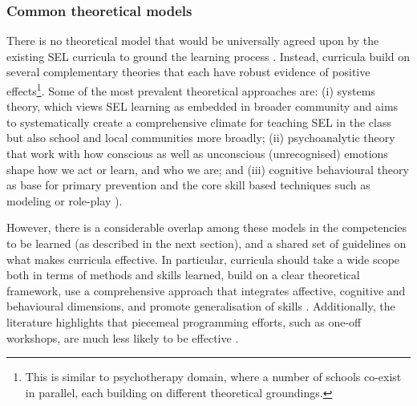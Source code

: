 \documentclass[prodmode,acmtochi]{acmsmall}
\newcommand{\qq}[2]{\textrm{\textit{``#2''}}{ [#1]}}
\begin{document}



\subsubsection{Common theoretical models}
There is no theoretical model that would be universally agreed upon by the existing SEL curricula to ground the learning process \cite{Payton2000}. Instead, curricula build on several complementary theories that each have robust evidence of positive effects\footnote{This is similar to psychotherapy domain, where a number of schools co-exist in parallel, each building on different theoretical groundings.}. 
Some of the most prevalent theoretical approaches are: (i) systems theory, which views SEL learning as embedded in broader community and aims to systematically create a comprehensive climate for teaching SEL in the class but also school and local communities more broadly; (ii) psychoanalytic theory that work with how conscious as well as unconscious (unrecognised) emotions shape how we act or learn, and who we are; and (iii) cognitive behavioural theory as base for primary prevention and the core skill based techniques such as modeling or role-play \cite[p.65]{Maree2007}).

However, there is a considerable overlap among these models in the competencies to be learned (as described in the next section), and a shared set of guidelines on what makes curricula effective. In particular, curricula should take a wide scope both in terms of methods and skills learned, build on a clear theoretical framework, use a comprehensive approach that integrates affective, cognitive and behavioural dimensions, and promote generalisation of skills \cite[p.119]{Elias1997}. Additionally, the literature highlights that piecemeal programming efforts, such as one-off workshops, are much less likely to be effective \cite[p.13]{Zins2004}.
\end{document}
